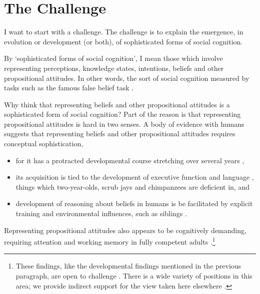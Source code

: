 \documentclass[12pt,a4paper]{extarticle}
\begin{document}
\setlength\footnotesep{1em}


\maketitle

\begin{abstract}
***
\end{abstract}


\section{The Challenge}
I want to start with a challenge.  
The challenge is to explain the emergence, in evolution or development (or both), of sophisticated forms of social cognition.

By `sophisticated forms of social cognition', I mean those which involve representing perceptions, knowledge states, intentions, beliefs and other propositional attitudes.
In other words, the sort of social cognition measured by tasks such as the famous false belief task \citep{Wimmer:1983dz}.

Why think that representing beliefs and other propositional attitudes is a sophisticated form of social cognition?
Part of the reason is that representing propositional attitudes is hard in two senses.  
A body of evidence with humans suggests that representing  beliefs and other propositional attitudes requires conceptual sophistication, 
%
\begin{itemize}
\item for it has a protracted developmental course stretching over several years \citep{Wimmer:1983dz,Wellman:2001lz}, 
\item its acquisition is tied to the development of executive function \citep{Perner:1999yr,Sabbagh:2006ke} and language \citep{Astington2005ot}, things which two-year-olds, scrub jays and chimpanzees are deficient in, and   
\item development of reasoning about beliefs in humans is be facilitated by explicit training \citep{Slaughter:1996fv} and environmental influences, such as siblings \citep{Clements:2000nc,Hughes:2004zj}.  
\end{itemize}
%
Representing propositional attitudes also appears to be cognitively demanding, requiring attention and working memory in fully competent adults \citep{Apperly:2008jv,Apperly:2009cc,McKinnon:2007rr}.\footnote{
These findings, like the developmental findings mentioned in the previous paragraph, are open to challenge \citep[e.g.][]{Leslie:2005ef}.  
There is a wide variety of positions in this area; we provide indirect support for the view taken here elsewhere \citep{Apperly:2009ju,butterfill_minimal}.
}
\end{document}
